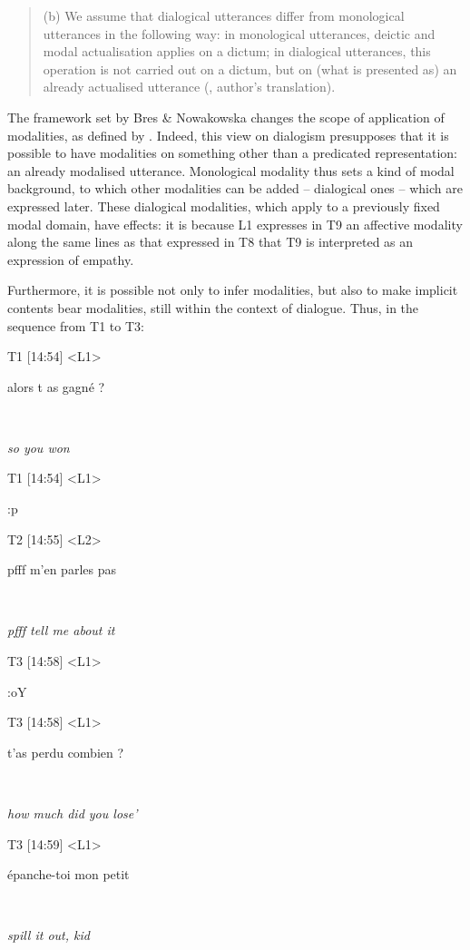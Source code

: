 \documentclass[output=paper]{langscibook}
\begin{document}
\begin{quote}
(b) We assume that dialogical utterances differ from monological utterances in the following way: in monological utterances, deictic and modal actualisation applies on a dictum; in dialogical utterances, this operation is not carried out on a dictum, but on (what is presented as) an already actualised utterance (\citealt[29]{BresNowakowska2006}, author’s translation).
\end{quote}

The framework set by Bres \& Nowakowska changes the scope of application of modalities, as defined by \citet{Gosselin2010}. Indeed, this view on dialogism presupposes that it is possible to have modalities on something other than a predicated representation: an already modalised utterance. Monological modality thus sets a kind of modal background, to which other modalities can be added – dialogical ones – which are expressed later. These dialogical modalities, which apply to a previously fixed modal domain, have effects: it is because L1 expresses in T9 an affective modality along the same lines as that expressed in T8 that T9 is interpreted as an expression of empathy.

Furthermore, it is possible not only to infer modalities, but also to make implicit contents bear modalities, still within the context of dialogue. Thus, in the sequence from T1 to T3: 

\ea 
\label{ex:key:6}

\ttfamily
\parbox{30mm}{T1 [14:54] <L1>}alors t as gagné ?\\
\parbox{30mm}{~}\textsl{so you won}\\
\parbox{30mm}{T1 [14:54] <L1>}:p\medskip

\parbox{30mm}{T2 [14:55] <L2>}pfff m'en parles pas\\
\parbox{30mm}{~}\textsl{pfff tell me about it}\medskip

\parbox{30mm}{T3 [14:58] <L1>}:oY\\
\parbox{30mm}{T3 [14:58] <L1>}t'as perdu combien ?\\
\parbox{30mm}{~}\textsl{how much did you lose’}\medskip
 
\parbox{30mm}{T3 [14:59] <L1>}épanche-toi mon petit\\
\parbox{30mm}{~}\textsl{spill it out, kid}\\

\z 
\end{document}
